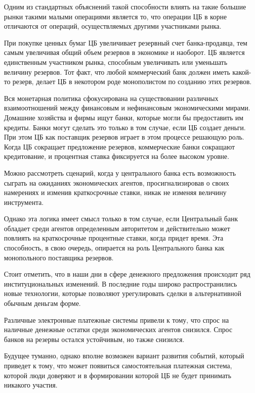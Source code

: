 \documentclass[14pt,a4paper, oneside]{extreport}
\begin{document}
Одним из стандартных объяснений такой способности влиять на такие большие рынки такими малыми операциями является то, что операции ЦБ в корне отличаются от операций, осуществляемых другими участниками рынка.

При покупке ценных бумаг ЦБ увеличивает резервный счет банка-продавца, тем самым увеличивая общий объем резервов в экономике и наоборот. ЦБ является единственным участником рынка, способным увеличивать или уменьшать величину резервов. Тот факт, что любой коммерческий банк должен иметь какой-то резерв, делает ЦБ в некотором роде монополистом по созданию этих резервов. 

Вся монетарная политика сфокусирована на существовании различных взаимоотношений между финансовым  и нефинансовым экономическими мирами. Домашние хозяйства и фирмы ищут банки, которые могли бы предоставить им кредиты. Банки могут сделать это только в том случае, если ЦБ создает деньги. При этом ЦБ как поставщик резервов играет в этом процессе решающую роль. Когда ЦБ сокращает предложение резервов, коммерческие банки сокращают кредитование, и процентная ставка фиксируется на более высоком уровне. 

Можно рассмотреть сценарий, когда у центрального банка есть возможность сыграть на ожиданиях экономических агентов, просигнализировав о своих намерениях и изменив краткосрочные ставки, никак не изменяя величину инструмента.  

Однако эта логика имеет смысл только в том случае, если Центральный банк обладает среди агентов определенным авторитетом и действительно может повлиять на краткосрочные процентные ставки, когда придет время. Эта способность, в свою очередь, опирается на роль Центрального банка как монопольного поставщика резервов. 

Стоит отметить, что в наши дни в сфере денежного предложения происходит ряд институциональных изменений. 
В последние годы широко распространились новые технологии, которые позволяют урегулировать сделки в альтернативной обычным деньгам форме. 

Различные электронные платежные системы привели к тому, что спрос на наличные денежные остатки среди экономических агентов снизился. Спрос банков на резервы остался устойчивым, но также снизился. 

Будущее туманно, однако вполне возможен вариант развития событий, который приведет к тому, что может появиться самостоятельная платежная система, которой люди доверяют и в формировании которой ЦБ не будет принимать никакого участия.
\end{document}
